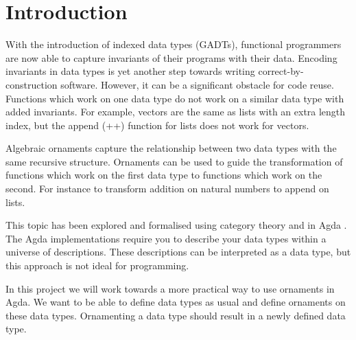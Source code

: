 \section{Introduction}\label{sec:introduction}

With the introduction of indexed data types (GADTs), functional
programmers are now able to capture invariants of their programs with
their data.
Encoding invariants in data types is yet another step towards writing
correct-by-construction software.
However, it can be a significant obstacle for code reuse.
Functions which work on one data type do not work on a similar data
type with added invariants.
For example, vectors are the same as lists with an extra length index,
but the append (++) function for lists does not work for vectors.

Algebraic ornaments capture the relationship between two data types
with the same recursive structure.
Ornaments can be used to guide the transformation of functions which
work on the first data type to functions which work on the
second\cite{dagand14-transporting, williams14}.
For instance to transform addition on natural numbers to append on lists.

This topic has been explored and formalised using category theory
\cite{dagand12, kogibbons13} and in Agda \cite{dagand14-transporting,
  dagand14-essence}.
The Agda implementations require you to describe your data types
within a universe of descriptions.
These descriptions can be interpreted as a data type, but this approach
is not ideal for programming.

In this project we will work towards a more practical way to use
ornaments in Agda.
We want to be able to define data types as usual and define ornaments
on these data types.
Ornamenting a data type should result in a newly defined data type.
